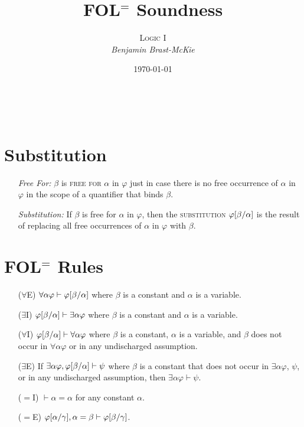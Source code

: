 \documentclass[a4paper, 11pt]{article} %
\title{\textbf{FOL$^=$ Soundness}} %
\author{\textsc{Logic I}\\ \em Benjamin Brast-McKie} %
\date{\today} %
\makeatletter
\renewcommand{\maketitle}{
\begin{flushright}
{\LARGE\@title}

\vspace{10pt}

{\@author}
\\ \@date
\end{flushright}

\vspace{30pt}

}
\makeatother
\begin{document}
\maketitle %

\thispagestyle{empty}



\section*{Substitution}

\begin{enumerate}
  \item[\it Free For:] $\beta$ is \textsc{free for} $\alpha$ in $\varphi$ just in case there is no free occurrence of $\alpha$ in $\varphi$ in the scope of a quantifier that binds $\beta$. 
  \item[\it Substitution:] If $\beta$ is free for $\alpha$ in $\varphi$, then the \textsc{substitution} $\varphi[\beta/\alpha]$ is the result of replacing all free occurrences of $\alpha$ in $\varphi$ with $\beta$.
\end{enumerate}
   






\section*{FOL$^=$ Rules}

\begin{enumerate}
  \item[($\forall$E)] $\forall\alpha\varphi \vdash \varphi[\beta/\alpha]$ where $\beta$ is a constant and $\alpha$ is a variable. 
  \item[($\exists$I)] $\varphi[\beta/\alpha] \vdash \exists\alpha\varphi$ where $\beta$ is a constant and $\alpha$ is a variable.
  \item[($\forall$I)] $\varphi[\beta/\alpha] \vdash \forall\alpha\varphi$ where $\beta$ is a constant, $\alpha$ is a variable, and $\beta$ does not occur in $\forall\alpha\varphi$ or in any undischarged assumption.
  \item[($\exists$E)] If $\exists\alpha\varphi,\varphi[\beta/\alpha] \vdash \psi$ where $\beta$ is a constant that does not occur in $\exists\alpha\varphi$, $\psi$, or in any undischarged assumption, then $\exists\alpha\varphi\vdash \psi$.
  \item[($=$I)] $\vdash \alpha = \alpha$ for any constant $\alpha$. 
  \item[($=$E)] $\varphi[\alpha/\gamma],\alpha=\beta\vdash\varphi[\beta/\gamma]$.
\end{enumerate}
\end{document}
